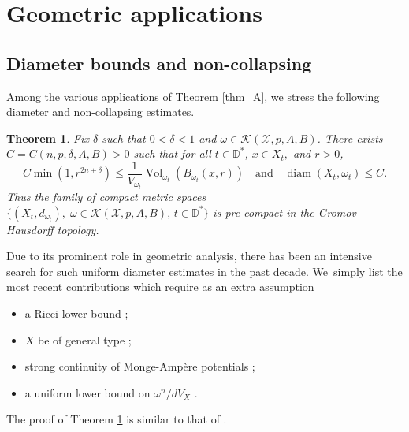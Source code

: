 \documentclass[JEP,XML,SOM,Unicode,published]{cedram}
\DeclareMathOperator{\diam}{diam}
\DeclareMathOperator{\Vol}{Vol}
\newtheorem{theorem}{Theorem}[section]
\theoremstyle{definition}
\newcommand{\D}{\mathbb D}
\begin{document}
\section{Geometric applications}

\subsection{Diameter bounds and non-collapsing}

Among the various applications of Theorem \ref{thm_A}, we stress the following diameter and non-collapsing estimates.

\begin{theorem} \label{thm:diameter}
Fix $\delta$ such that $0<\delta<1$ and $\omega \in {\mathcal K}(\mathcal{X},p,A,B)$.
There exists $C=C(n,p,\delta,A,B)>0$ such that for all $ t \in \D^*$, $x \in X_t, $ and $r>0$,
\[
C \min(1,r^{2n+\delta}) \leq \frac{1}{V_{\omega_t}} \Vol_{\omega_t}(B_{\omega_t}(x,r))
\quad \text{and} \quad
\diam(X_t,\omega_t) \leq C.
\]
Thus the family of compact metric spaces
$\{ (X_t,d_{\omega_t}), \; \omega \in {\mathcal K}(\mathcal{X},p,A,B), \, t \in \D^* \}$
is pre-compact in the Gromov-Hausdorff topology.
\end{theorem}

Due to its prominent role in geometric analysis, there has been an intensive search for such uniform diameter estimates in the past decade. We~simply list the most recent contributions which require as an extra assumption
\begin{itemize}
\item a Ricci lower bound \cite{LTZ17,FGS20,GS22};
\item $X$ be of general type \cite{Bam18,Wang18,JS22};
\item strong continuity of Monge-Ampère potentials \cite{Li21,GGZ23,V23};
\item a uniform lower bound on $\omega^n/dV_X$ \cite{GPS22,GPSS22,GPSS23}.
\end{itemize}

The proof of Theorem \ref{thm:diameter} is similar to that of \cite[Th.\,1.1]{GPSS22}.
\end{document}
